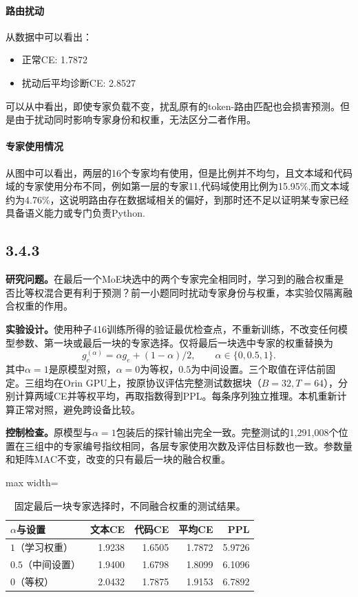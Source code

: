\documentclass{article}
\begin{document}
\paragraph{路由扰动} 从数据中可以看出：
\begin{itemize}
    \item 正常CE: 1.7872
    \item 扰动后平均诊断CE: 2.8527
\end{itemize}
可以从中看出，即使专家负载不变，扰乱原有的token-路由匹配也会损害预测。但是由于扰动同时影响专家身份和权重，无法区分二者作用。

\paragraph{专家使用情况} 从图中可以看出，两层的16个专家均有使用，但是比例并不均匀，且文本域和代码域的专家使用分布不同，例如第一层的专家11,代码域使用比例为15.95\%,而文本域约为4.76\%，这说明路由存在数据域相关的偏好，到那时还不足以证明某专家已经具备语义能力或专门负责Python.


\subsection{3.4.3}

\textbf{研究问题。}在最后一个MoE块选中的两个专家完全相同时，学习到的融合权重是否比等权混合更有利于预测？前一小题同时扰动专家身份与权重，本实验仅隔离融合权重的作用。

\textbf{实验设计。}使用种子416训练所得的验证最优检查点，不重新训练，不改变任何模型参数、第一块或最后一块的专家选择。仅将最后一块选中专家的权重替换为
\[
    g_e^{(\alpha)}=\alpha g_e+(1-\alpha)/2,
    \qquad \alpha\in\{0,0.5,1\}.
\]
其中$\alpha=1$是原模型对照，$\alpha=0$为等权，$0.5$为中间设置。三个取值在评估前固定。三组均在Orin GPU上，按原协议评估完整测试数据块（$B=32,T=64$），分别计算两域CE并等权平均，再取指数得到PPL。每条序列独立推理。本机重新计算正常对照，避免跨设备比较。

\textbf{控制检查。}原模型与$\alpha=1$包装后的探针输出完全一致。完整测试的1,291,008个位置在三组中的专家编号指纹相同，各层专家使用次数及评估目标数也一致。参数量和矩阵MAC不变，改变的只有最后一块的融合权重。

\begin{table}[H]
    \centering
    \caption{固定最后一块专家选择时，不同融合权重的测试结果。}
    \label{table:gate_weights}
    \begin{adjustbox}{max width=\linewidth}
        \begin{tabular}{lrrrr}
            \hline
            $\alpha$与设置 & 文本CE & 代码CE & 平均CE & PPL \\
            \hline
            $1$（学习权重） & 1.9238 & 1.6505 & 1.7872 & 5.9726 \\
            $0.5$（中间设置） & 1.9400 & 1.6798 & 1.8099 & 6.1096 \\
            $0$（等权） & 2.0432 & 1.7875 & 1.9153 & 6.7892 \\
            \hline
        \end{tabular}%
    \end{adjustbox}
\end{table}
\end{document}
